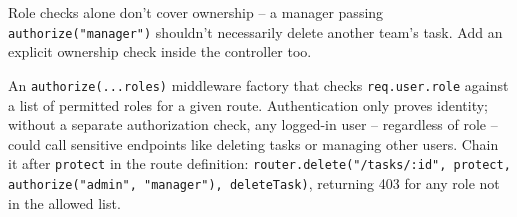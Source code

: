 \begin{warnbox}[WARNING]
Role checks alone don't cover ownership -- a manager passing \texttt{authorize("manager")} shouldn't necessarily delete another team's task. Add an explicit ownership check inside the controller too.
\end{warnbox}

\whatwhyhow
{An \texttt{authorize(...roles)} middleware factory that checks \texttt{req.user.role} against a list of permitted roles for a given route.}
{Authentication only proves identity; without a separate authorization check, any logged-in user -- regardless of role -- could call sensitive endpoints like deleting tasks or managing other users.}
{Chain it after \texttt{protect} in the route definition: \texttt{router.delete("/tasks/:id", protect, authorize("admin", "manager"), deleteTask)}, returning 403 for any role not in the allowed list.}
